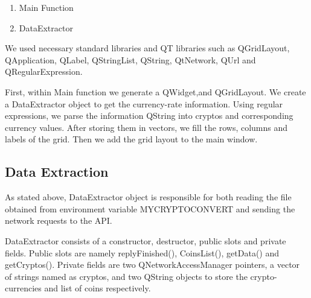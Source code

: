 \documentclass[12pt,a4paper]{article}
\begin{document}
\begin{enumerate}
 \item Main Function
 \item DataExtractor
\end{enumerate}

We used necessary standard libraries and QT libraries such as QGridLayout, QApplication, QLabel, QStringList, QString, QtNetwork, QUrl and QRegularExpression. \par
First, within Main function we generate a QWidget,and QGridLayout. We create a DataExtractor object to get the currency-rate information. Using regular expressions, we parse the information QString into cryptos and corresponding currency values. After storing them in vectors, we fill the rows, columns and labels of the grid. Then we add the grid layout to the main window. \par


\subsection{Data Extraction}

As stated above, DataExtractor object is responsible for both reading the file obtained from environment variable MYCRYPTOCONVERT and sending the network requests to the API. \par
DataExtractor consists of a constructor, destructor, public slots and private fields. Public slots are namely replyFinished(), CoinsList(), getData() and getCryptos(). Private fields are two QNetworkAccessManager pointers, a vector of strings named as cryptos, and two QString objects to store the crypto-currencies and list of coins respectively. \par
\end{document}
